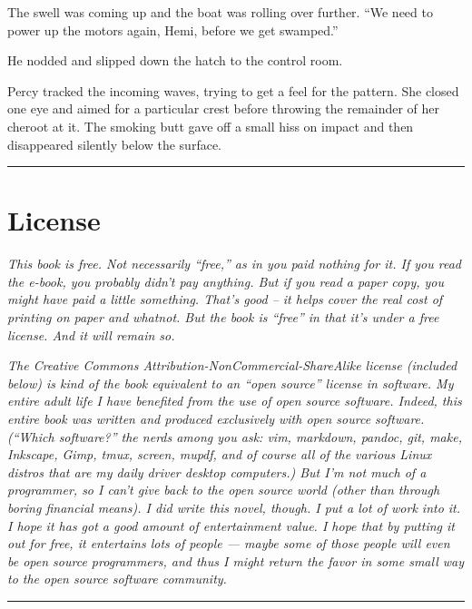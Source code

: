 \documentclass[
]{scrbook}
\begin{document}
The swell was coming up and the boat was rolling over further. ``We need
to power up the motors again, Hemi, before we get swamped.''

He nodded and slipped down the hatch to the control room.

Percy tracked the incoming waves, trying to get a feel for the pattern.
She closed one eye and aimed for a particular crest before throwing the
remainder of her cheroot at it. The smoking butt gave off a small hiss
on impact and then disappeared silently below the surface.

\newpage

\begin{center}\rule{0.5\linewidth}{0.5pt}\end{center}

\hypertarget{license}{%
\section{License}\label{license}}

\emph{This book is free. Not necessarily ``free,'' as in you paid
nothing for it. If you read the e-book, you probably didn't pay
anything. But if you read a paper copy, you might have paid a little
something. That's good -- it helps cover the real cost of printing on
paper and whatnot. But the book is ``free'' in that it's under a free
license. And it will remain so.}

\emph{The Creative Commons Attribution-NonCommercial-ShareAlike license
(included below) is kind of the book equivalent to an ``open source''
license in software. My entire adult life I have benefited from the use
of open source software. Indeed, this entire book was written and
produced exclusively with open source software. (``Which software?'' the
nerds among you ask: vim, markdown, pandoc, git, make, Inkscape, Gimp,
tmux, screen, mupdf, and of course all of the various Linux distros that
are my daily driver desktop computers.) But I'm not much of a
programmer, so I can't give back to the open source world (other than
through boring financial means). I did write this novel, though. I put a
lot of work into it. I hope it has got a good amount of entertainment
value. I hope that by putting it out for free, it entertains lots of
people --- maybe some of those people will even be open source
programmers, and thus I might return the favor in some small way to the
open source software community.}

\tiny

\begin{center}\rule{0.5\linewidth}{0.5pt}\end{center}
\end{document}
